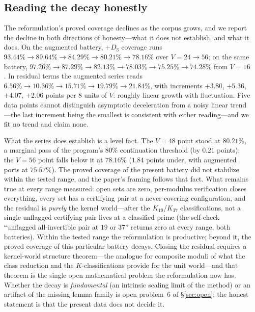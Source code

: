 \subsection{Reading the decay honestly}

The reformulation's proved coverage declines as the corpus grows, and we
report the decline in both directions of honesty---what it does not
establish, and what it does. On the augmented battery, $+D_3$ coverage
runs $93.44\%\to89.64\%\to84.29\%\to80.21\%\to78.16\%$ over
$V=24\to56$; on the same battery,
$97.26\%\to87.29\%\to82.13\%\to78.03\%\to75.25\%\to74.28\%$ from
$V=16$. In residual terms the augmented series reads
$6.56\%\to10.36\%\to15.71\%\to19.79\%\to21.84\%$, with increments
$+3.80$, $+5.36$, $+4.07$, $+2.06$ points per $8$ units of $V$: roughly
linear growth with fluctuation. Five data points cannot distinguish
asymptotic deceleration from a noisy linear trend---the last increment
being the smallest is consistent with either reading---and we fit no
trend and claim none.

What the series does establish is a level fact. The $V=48$ point stood
at $80.21\%$, a marginal pass of the program's $80\%$ continuation
threshold (by $0.21$ points); the $V=56$ point falls below it at
$78.16\%$ ($1.84$ points under, with augmented ports at $75.57\%$). The
proved coverage of the present battery did not stabilize within the
tested range, and the paper's framing follows that fact. What remains
true at every range measured: open sets are zero, per-modulus
verification closes everything, every set has a certifying pair at a
never-covering configuration, and the residual is \emph{purely} the
kernel world---after the $K_{19}$/$K_{37}$ classifications, not a single
unflagged certifying pair lives at a classified prime (the self-check
``unflagged all-invertible pair at $19$ or $37$'' returns zero at every
range, both batteries). Within the tested range the reformulation is
productive; beyond it, the proved coverage of this particular battery
decays. Closing the residual requires a kernel-world structure
theorem---the analogue for composite moduli of what the class reduction
and the $K$-classifications provide for the unit world---and that theorem
is the single open mathematical problem the reformulation now has.
Whether the decay is \emph{fundamental} (an intrinsic scaling limit of
the method) or an artifact of the missing lemma family is open
problem~6 of \S\ref{sec:open}; the honest statement is that the present
data does not decide it.

